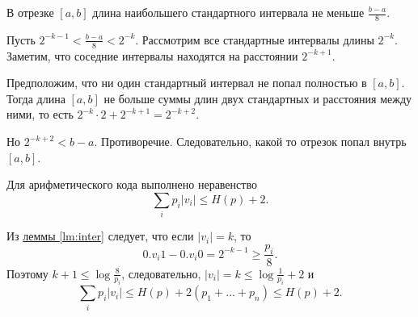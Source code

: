 \begin{lm}\label{lm:inter}
	В отрезке $ [a, b]$ длина наибольшего стандартного интервала не меньше $ \frac{b-a}{8}$.
\end{lm}
\begin{proof*}
	Пусть $ 2^{-k-1} < \frac{b-a}{8} < 2^{-k}$.
	Рассмотрим все стандартные интервалы длины $ 2^{-k}$. Заметим, что соседние интервалы находятся на расстоянии $ 2^{-k+1}$.

	Предположим, что ни один стандартный интервал не попал полностью в $ [a, b]$. Тогда длина  $ [a, b]$ не больше суммы длин двух стандартных и расстояния между ними,
	то есть $ 2^{-k} \cdot  2 + 2^{-k+1} = 2^{-k+2}$. 

	Но $ 2^{-k+2} < b -a $. Противоречие.  Следовательно,  какой то отрезок попал внутрь $ [a, b]$.
\end{proof*}
\begin{thm}
    Для арифметического кода выполнено неравенство
	\[
		\sum_{i} p_i \lvert v_i \rvert  \le H(p) + 2
	.\] 
\end{thm}
\begin{proof*}
	Из \hyperref[lm:inter]{леммы \ref{lm:inter}} следует, что если $ \lvert v_i \rvert = k$, то 
	\[
		0.v_i 1 - 0.v_i 0 = 2^{-k-1} \ge \frac{p_i}{ 8}
	.\] 
	Поэтому $ k+1 \le \log \frac{8}{p_i}$, следовательно, $ \lvert v_i \rvert = k \le \log \frac{1}{p_i} + 2$ и
	\[
		\sum_i p _i \lvert v_i \rvert \le H(p) + 2 (p_1+ \ldots +p_n) \le H(p) + 2
	.\] 
\end{proof*}

